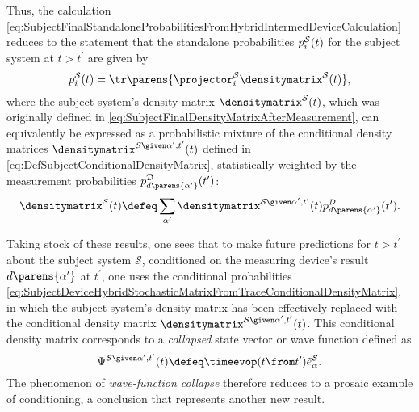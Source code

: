 \documentclass[12pt,english,prl,superscriptaddress,nobibnotes,nofootinbib]{revtex4-2}
\let\originalleft\left
\let\originalright\right
\renewcommand{\left}{\mathopen{}\mathclose\bgroup\originalleft}
\renewcommand{\right}{\aftergroup\egroup\originalright}
\begin{document}
Thus, the calculation \eqref{eq:SubjectFinalStandaloneProbabilitiesFromHybridIntermedDeviceCalculation}
reduces to the statement that the standalone probabilities $p_{i}^{\mathcal{S}}\left(t\right)$
for the subject system at $t>t^{\prime}$ are given by 
\begin{equation}
p_{i}^{\mathcal{S}}\left(t\right)=\tr\parens{\projector_{i}^{\mathcal{S}}\densitymatrix^{\mathcal{S}}\left(t\right)},\label{eq:SubjectFinalStandaloneProbabilitiesFromTraceAfterMeasurementForCollapse}
\end{equation}
 where the subject system's density matrix $\densitymatrix^{\mathcal{S}}\left(t\right)$,
which was originally defined in \eqref{eq:SubjectFinalDensityMatrixAfterMeasurement},
can equivalently be expressed as a probabilistic mixture of the conditional
density matrices $\densitymatrix^{\mathcal{S}\given\alpha^{\prime},t^{\prime}}\left(t\right)$
defined in \eqref{eq:DefSubjectConditionalDensityMatrix}, statistically
weighted by the measurement probabilities $p_{d\parens{\alpha^{\prime}}}^{\mathcal{D}}\left(t^{\prime}\right)$:
\begin{equation}
\densitymatrix^{\mathcal{S}}\left(t\right)\defeq\sum_{\alpha^{\prime}}\densitymatrix^{\mathcal{S}\given\alpha^{\prime},t^{\prime}}\left(t\right)p_{d\parens{\alpha^{\prime}}}^{\mathcal{D}}\left(t^{\prime}\right).\label{eq:SubjectFindDensityMatrixFromIntermedAfterMeasurement}
\end{equation}

Taking stock of these results, one sees that to make future predictions
for $t>t^{\prime}$ about the subject system $\mathcal{S}$, conditioned
on the measuring device's result $d\parens{\alpha^{\prime}}$ at $t^{\prime}$,
one uses the conditional probabilities \eqref{eq:SubjectDeviceHybridStochasticMatrixFromTraceConditionalDensityMatrix},
in which the subject system's density matrix has been effectively
replaced with the conditional density matrix $\densitymatrix^{\mathcal{S}\given\alpha^{\prime},t^{\prime}}\left(t\right)$.
This conditional density matrix corresponds to a \emph{collapsed}
state vector or wave function defined as 
\begin{equation}
\Psi^{\mathcal{S}\given\alpha^{\prime},t^{\prime}}\left(t\right)\defeq\timeevop\left(t\from t^{\prime}\right)\tilde{e}_{\alpha}^{\mathcal{S}}.\label{eq:SubjectWaveFunctionCollapse}
\end{equation}
 The phenomenon of \emph{wave-function collapse} therefore reduces
to a prosaic example of conditioning, a conclusion that represents
another new result.
\end{document}
